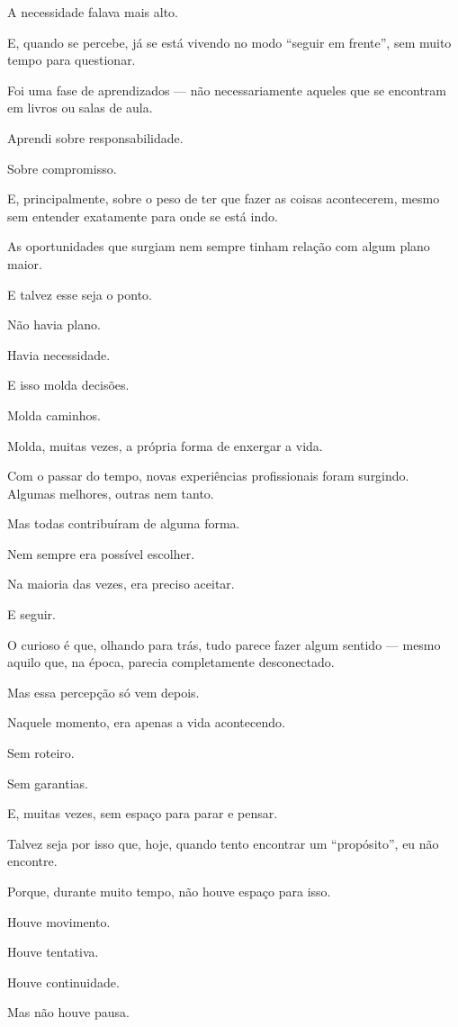 A necessidade falava mais alto.

E, quando se percebe, já se está vivendo no modo “seguir em frente”, sem muito tempo para questionar.

Foi uma fase de aprendizados — não necessariamente aqueles que se encontram em livros ou salas de aula.

Aprendi sobre responsabilidade.

Sobre compromisso.

E, principalmente, sobre o peso de ter que fazer as coisas acontecerem, mesmo sem entender exatamente para onde se está indo.

As oportunidades que surgiam nem sempre tinham relação com algum plano maior.

E talvez esse seja o ponto.

Não havia plano.

Havia necessidade.

E isso molda decisões.

Molda caminhos.

Molda, muitas vezes, a própria forma de enxergar a vida.

Com o passar do tempo, novas experiências profissionais foram surgindo. Algumas melhores, outras nem tanto. 

Mas todas contribuíram de alguma forma.

Nem sempre era possível escolher.

Na maioria das vezes, era preciso aceitar.

E seguir.

O curioso é que, olhando para trás, tudo parece fazer algum sentido — mesmo aquilo que, na época, parecia completamente desconectado.

Mas essa percepção só vem depois.

Naquele momento, era apenas a vida acontecendo.

Sem roteiro.

Sem garantias.

E, muitas vezes, sem espaço para parar e pensar.

Talvez seja por isso que, hoje, quando tento encontrar um “propósito”, eu não encontre.

Porque, durante muito tempo, não houve espaço para isso.

Houve movimento.

Houve tentativa.

Houve continuidade.

Mas não houve pausa.

